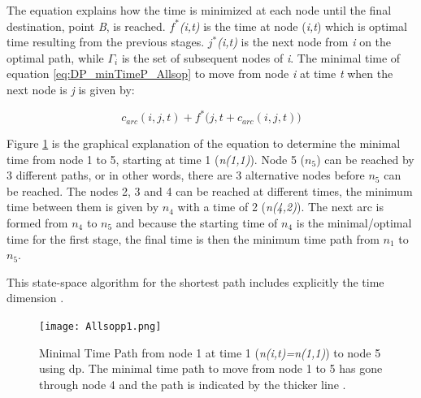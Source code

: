 The equation explains how the time is minimized at each node until the final destination, point \textit{B}, is reached. $f^*$\textit{(i,t)} is the time at node (\textit{i,t}) which is optimal time resulting from the previous stages. $j^*$\textit{(i,t)} is the next node from \textit{i} on the optimal path, while $\Gamma_{i}$ is the set of subsequent nodes of \textit{i}. The minimal time of equation \ref{eq:DP_minTimeP_Allsop} to move from node \textit{i} at time \textit{t} when the next node is \textit{j} is given by:\par 
\begin{equation*}
    c_{arc}(i,j,t)+f^*\Big(j,t + c_{arc}(i,j,t)\Big) 
\end{equation*}

\noindent
Figure \ref{fig:dp_Allsop} is the graphical explanation of the equation to determine the minimal time from node 1 to 5, starting at time 1 (\textit{n(1,1)}). Node 5 ($n_{5}$) can be reached by 3 different paths, or in other words, there are 3 alternative nodes before $n_{5}$ can be reached.  The nodes 2, 3 and 4 can be reached at different times, the minimum time between them is given by $n_{4}$ with a time of 2 (\textit{n(4,2)}). The next arc is formed from $n_{4}$ to $n_{5}$ and because the starting time of $n_{4}$ is the minimal/optimal time for the first stage, the final time is then the minimum time path from $n_{1}$ to $n_{5}$. \par \noindent
This state-space algorithm for the shortest path includes explicitly the time dimension \cite{allsopp1998stochastic}.

\begin{figure}[hbt!]
    \centering
    \texttt{[image: Allsopp1.png]}
    \caption{Minimal Time Path from node 1 at time 1 (\textit{n(i,t)=n(1,1)}) to node 5 using \acrshort{dp}. The minimal time path to move from node 1 to 5 has gone through node 4 and the path is indicated by the thicker  line \cite{allsopp2000optimal}.}
    \label{fig:dp_Allsop}
\end{figure}
\par 

